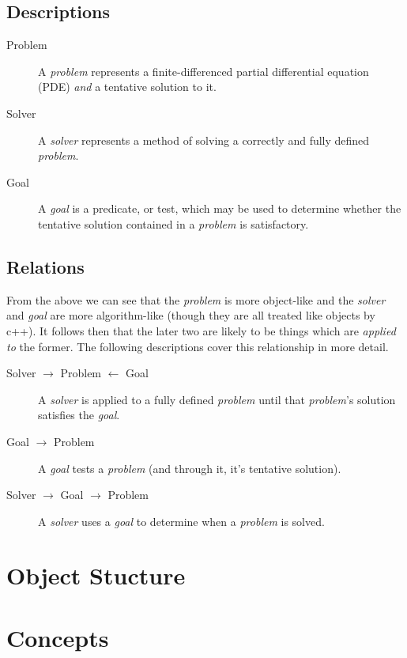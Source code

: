 \documentclass{article}
\begin{document}
\subsection{Descriptions}

\begin{description}
\item[Problem]
A \emph{problem} represents a finite-differenced partial differential
	equation (PDE) \emph{and} a tentative solution to it.
\item[Solver]
A \emph{solver} represents a method of solving a correctly and fully
	defined \emph{problem}.
\item[Goal]
A \emph{goal} is a predicate, or test, which may be used to determine
	whether the tentative solution contained in a \emph{problem} is 
	satisfactory.
\end{description}

\subsection{Relations}
From the above we can see that the \emph{problem} is more object-like and the
\emph{solver} and \emph{goal} are more algorithm-like (though they are all 
treated like objects by c++). It follows then that the later two are likely to 
be things which are \emph{applied to} the former. The following descriptions 
cover this relationship in more detail.

\begin{description}
\item[Solver $\rightarrow$ Problem $\leftarrow$ Goal]
A \emph{solver} is applied to a fully defined \emph{problem} until that 
\emph{problem}'s
  solution satisfies the \emph{goal}.
\item[Goal $\rightarrow$ Problem]
A \emph{goal} tests a \emph{problem} (and through it, it's tentative solution).
\item[Solver $\rightarrow$ Goal $\rightarrow$ Problem]
  A \emph{solver} uses a \emph{goal} to determine when a \emph{problem} is 
  solved.
\end{description}

\section{Object Stucture}

\section{Concepts}
\end{document}
